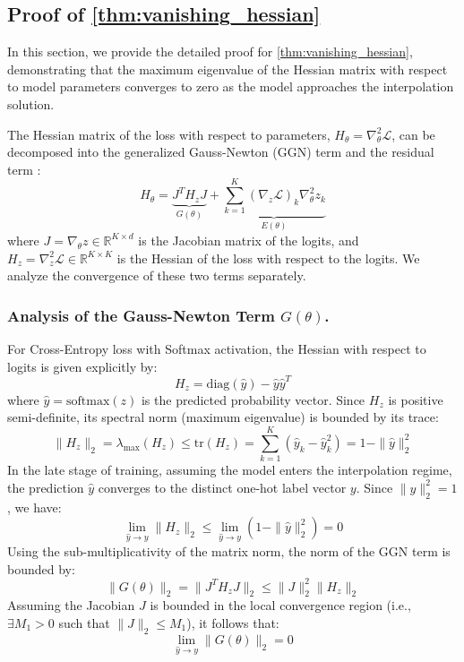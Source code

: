 \documentclass{article}
\theoremstyle{plain}
\theoremstyle{definition}
\theoremstyle{remark}
\begin{document}
\subsection{Proof of \cref{thm:vanishing_hessian}}
\label{app:proof_lambda}
In this section, we provide the detailed proof for \cref{thm:vanishing_hessian}, 
demonstrating that the maximum eigenvalue of the Hessian matrix with respect to model parameters 
converges to zero as the model approaches the interpolation solution.

The Hessian matrix of the loss with respect to parameters, $H_\theta = \nabla^2_\theta \mathcal{L}$, can be decomposed into the generalized Gauss-Newton (GGN) term and the residual term \cite{papyan2020a}:
\begin{equation}
    H_\theta = \underbrace{J^T H_z J}_{G(\theta)} + \underbrace{\sum_{k=1}^K (\nabla_z \mathcal{L})_k \nabla^2_\theta z_k}_{E(\theta)}
    \label{eq:Hessian}
\end{equation}
where $J = \nabla_\theta z \in \mathbb{R}^{K \times d}$ is the Jacobian matrix of the logits, and $H_z = \nabla^2_z \mathcal{L} \in \mathbb{R}^{K \times K}$ is the Hessian of the loss with respect to the logits. We analyze the convergence of these two terms separately.

\subsubsection{Analysis of the Gauss-Newton Term $G(\theta)$.}
For Cross-Entropy loss with Softmax activation, the Hessian with respect to logits is given explicitly by:
\begin{equation}
    H_z = \text{diag}(\hat{y}) - \hat{y}\hat{y}^T
\end{equation}
where $\hat{y} = \text{softmax}(z)$ is the predicted probability vector. Since $H_z$ is positive semi-definite, its spectral norm (maximum eigenvalue) is bounded by its trace:
\begin{equation}
    \|H_z\|_2 = \lambda_{\max}(H_z) \leq \text{tr}(H_z) = \sum_{k=1}^K (\hat{y}_k - \hat{y}_k^2) = 1 - \|\hat{y}\|_2^2
\end{equation}
In the late stage of training, assuming the model enters the interpolation regime, the prediction $\hat{y}$ converges to the distinct one-hot label vector $y$. Since $\|y\|_2^2 = 1$, we have:
\begin{equation}
    \lim_{\hat{y} \to y} \|H_z\|_2 \leq \lim_{\hat{y} \to y} (1 - \|\hat{y}\|_2^2) = 0
\end{equation}
Using the sub-multiplicativity of the matrix norm, the norm of the GGN term is bounded by:
\begin{equation}
    \|G(\theta)\|_2 = \|J^T H_z J\|_2 \leq \|J\|_2^2 \|H_z\|_2
\end{equation}
Assuming the Jacobian $J$ is bounded in the local convergence region (i.e., $\exists M_1 > 0$ such that $\|J\|_2 \leq M_1$), it follows that:
\begin{equation}
    \lim_{\hat{y} \to y} \|G(\theta)\|_2 = 0
\end{equation}
\end{document}
